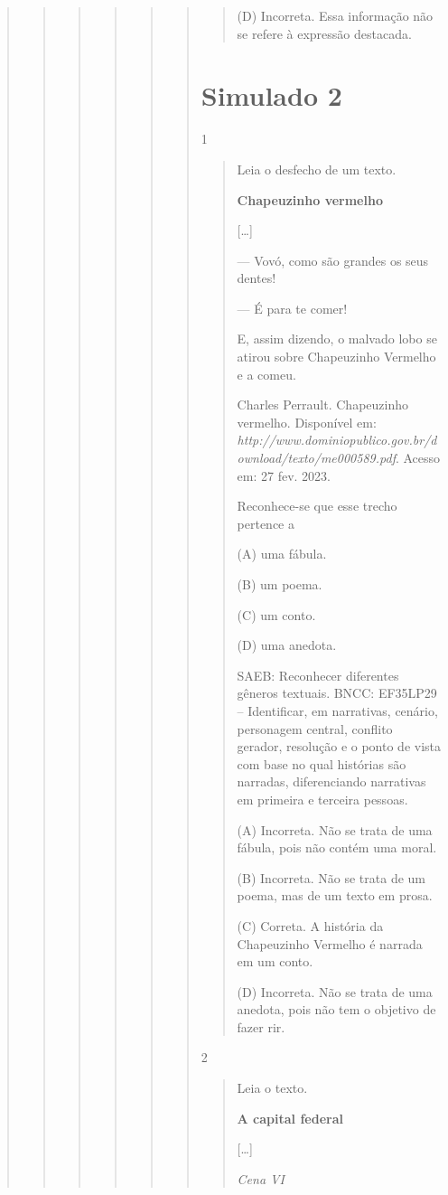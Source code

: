 \begin{boxlist}
{{\begin{quote}
\begin{quote}
\begin{quote}
{\begin{quote}
{\begin{quote}
\begin{quote}
\begin{quote}
(D) Incorreta. Essa informação não se refere à expressão destacada.
\end{quote}

\chapter{Simulado 2}

\num{1}

\begin{quote}
Leia o desfecho de um texto.

\textbf{Chapeuzinho vermelho}

{[}\ldots{}{]}

--- Vovó, como são grandes os seus dentes!

--- É para te comer!

E, assim dizendo, o malvado lobo se atirou sobre Chapeuzinho Vermelho e a
comeu.

Charles Perrault. Chapeuzinho vermelho. Disponível em:
\emph{http://www.dominiopublico.gov.br/download/texto/me000589.pdf}.
Acesso em: 27 fev. 2023.

Reconhece-se que esse trecho pertence a

(A) uma fábula.

(B) um poema.

(C) um conto.

(D) uma anedota.

SAEB: Reconhecer diferentes gêneros textuais.
BNCC: EF35LP29 -- Identificar, em narrativas, cenário, personagem central,
conflito gerador, resolução e o ponto de vista com base no qual
histórias são narradas, diferenciando narrativas em primeira e terceira
pessoas.

(A) Incorreta. Não se trata de uma fábula, pois não contém uma moral.

(B) Incorreta. Não se trata de um poema, mas de um texto em prosa.

(C) Correta. A história da Chapeuzinho Vermelho é narrada em um conto.

(D) Incorreta. Não se trata de uma anedota, pois não tem o objetivo de fazer rir.
\end{quote}

\num{2}

\begin{quote}
Leia o texto.

\textbf{A capital federal}

{[}\ldots{}{]}

\textit{Cena VI}


\end{quote}
\end{quote}
\end{quote}}
\end{quote}}
\end{quote}
\end{quote}
\end{quote}}}
\end{boxlist}
